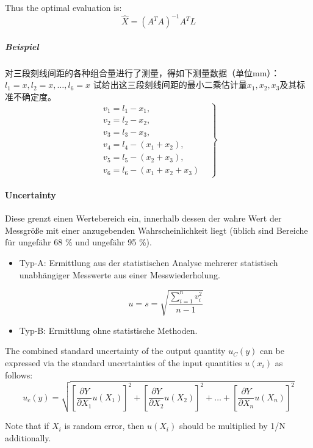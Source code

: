 Thus the optimal evaluation is:
\begin{equation*}
  \hat{X}=(A^TA)^{-1}A^TL
\end{equation*}

\subparagraph{Beispiel}
对三段刻线间距的各种组合量进行了测量，得如下测量数据（单位mm）：
$l_1=x,l_2=x,\dots,l_6=x$
试给出这三段刻线间距的最小二乘估计量$x_1,x_2,x_3$及其标准不确定度。
\begin{equation*}
\left.
  \begin{array}{lr}
    v_1 = l_1 - x_1, &  \\
    v_2 = l_2 - x_2, & \\
    v_3 = l_3 - x_3, & \\
    v_4 = l_4 - (x_1+x_2), & \\
    v_5 = l_5 - (x_2+x_3), & \\
    v_6 = l_6 - (x_1+x_2+x_3)
  \end{array}
\right\}
\end{equation*}

\paragraph{Uncertainty} Diese grenzt einen Wertebereich ein, innerhalb dessen der wahre Wert der Messgröße mit einer anzugebenden Wahrscheinlichkeit liegt (üblich sind Bereiche für ungefähr 68 \% und ungefähr 95 \%).

\begin{itemize}
  \item Typ-A: Ermittlung aus der statistischen Analyse mehrerer statistisch unabhängiger Messwerte aus einer Messwiederholung.

  $$u=s=\sqrt{\frac{\sum_{i=1}^{n}v_i^2}{n-1}}$$

  \item Typ-B: Ermittlung ohne statistische Methoden.
\end{itemize}

The combined standard uncertainty of the output quantity $u_C(y)$ can be expressed via the standard uncertainties of the input quantities $u(x_i)$ as follows:
\begin{equation*}
  u_c(y)=\sqrt{[\frac{\partial Y}{\partial X_1} u(X_1)]^2+[\frac{\partial Y}{\partial X_2} u(X_2)]^2+\dots+[\frac{\partial Y}{\partial X_n}u(X_n)]^2}
\end{equation*}

Note that if $X_i$ is random error, then $u(X_i)$ should be multiplied by 1/N additionally.

